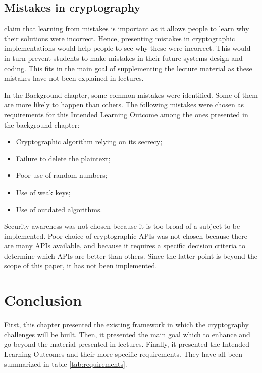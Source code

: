 \documentclass{l4proj}
\begin{document}
\subsection{Mistakes in cryptography}

\citet{eggleton_value_2001} claim that learning from mistakes is important as it allows people to 
learn why their solutions were incorrect. Hence, presenting mistakes in 
cryptographic implementations would help people to see why these were incorrect.
This would in turn prevent students to make mistakes in their future systems design and coding.
This fits in the main goal of supplementing the lecture material as these mistakes 
have not been explained in lectures.

In the Background chapter, some common mistakes were identified. 
Some of them are more likely to happen than others.
The following mistakes were chosen as requirements for this Intended Learning Outcome among the ones presented in the background chapter:
\begin{itemize}
    \item Cryptographic algorithm relying on its secrecy;
    \item Failure to delete the plaintext;
    \item Poor use of random numbers;
    \item Use of weak keys;
    \item Use of outdated algorithms.
\end{itemize}
Security awareness was not chosen because it is too broad of a subject to be implemented. 
Poor choice of cryptographic APIs was not chosen because there are many APIs available,
and because it requires a specific decision criteria to determine which APIs are better than others.
Since the latter point is beyond the scope of this paper, it has not been implemented. 

\section{Conclusion}

First, this chapter presented the existing framework in which the cryptography challenges will be
built. Then, it presented the main goal which to enhance and go beyond the material presented in lectures.
Finally, it presented the Intended Learning Outcomes and their more specific requirements.
They have all been summarized in table \ref{tab:requirements}.
\end{document}
